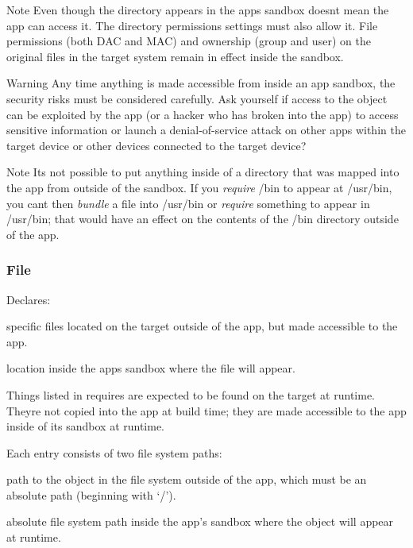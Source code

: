 \begin{DoxyNote}{Note}
Even though the directory appears in the app\textquotesingle{}s sandbox doesn\textquotesingle{}t mean the app can access it. The directory permissions settings must also allow it. File permissions (both D\+A\+C and M\+A\+C) and ownership (group and user) on the original files in the target system remain in effect inside the sandbox.
\end{DoxyNote}
\begin{DoxyWarning}{Warning}
Any time anything is made accessible from inside an app sandbox, the security risks must be considered carefully. Ask yourself if access to the object can be exploited by the app (or a hacker who has broken into the app) to access sensitive information or launch a denial-\/of-\/service attack on other apps within the target device or other devices connected to the target device?
\end{DoxyWarning}
\begin{DoxyNote}{Note}
It\textquotesingle{}s not possible to put anything inside of a directory that was mapped into the app from outside of the sandbox. If you {\itshape require} {\ttfamily /bin} to appear at {\ttfamily /usr/bin}, you can\textquotesingle{}t then {\itshape bundle} a file into {\ttfamily /usr/bin} or {\itshape require} something to appear in {\ttfamily /usr/bin}; that would have an effect on the contents of the /bin directory outside of the app.
\end{DoxyNote}
\hypertarget{def_files_adef_defFilesAdef_requiresFile}{}\subsubsection{File}\label{def_files_adef_defFilesAdef_requiresFile}
Declares\+:
\begin{DoxyItemize}
\item specific files located on the target outside of the app, but made accessible to the app.
\item location inside the app\textquotesingle{}s sandbox where the file will appear.
\end{DoxyItemize}

Things listed in {\ttfamily requires} are expected to be found on the target at runtime. They\textquotesingle{}re not copied into the app at build time; they are made accessible to the app inside of its sandbox at runtime.

Each entry consists of two file system paths\+:


\begin{DoxyItemize}
\item path to the object in the file system outside of the app, which must be an absolute path (beginning with ‘/’).
\item absolute file system path inside the app’s sandbox where the object will appear at runtime.
\end{DoxyItemize}

